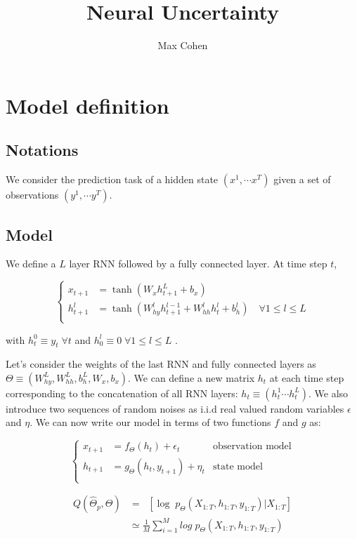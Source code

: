 \documentclass[11pt,a4paper]{report}
\begin{document}
\title{Neural Uncertainty}
\author{Max Cohen}
\maketitle

\chapter{Model definition}
\section{Notations}
We consider the prediction task of a hidden state $(x^1, \cdots x^T)$ given a set of observations $(y^1, \cdots y^T)$.

\section{Model}
We define a $L$ layer RNN followed by a fully connected layer. At time step $t$,

\begin{equation*}
    \left\{
    \begin{aligned}
        x_{t+1}   & = \tanh(W_x h_{t+1}^L + b_x)                                                               \\
        h_{t+1}^l & = \tanh(W_{hy}^l h^{l-1}_{t+1} + W_{hh}^l h^{l}_{t} + b_h^l) \quad \forall 1 \leq l \leq L \\
    \end{aligned}
    \right.
\end{equation*}

with $h_{t}^0 \equiv y_{t} \; \forall t$ and $h_{0}^l \equiv 0 \; \forall 1 \leq l \leq L$ .

Let's consider the weights of the last RNN and fully connected layers as $\Theta \equiv (W_{hy}^L, W_{hh}^L, b_h^L, W_x, b_x)$. We can define a new matrix $h_t$ at each time step corresponding to the concatenation of all RNN layers: $h_t \equiv (h_t^1 \cdots h_t^L)$. We also introduce two sequences of random noises as i.i.d real valued random variables $\epsilon$ and $\eta$. We can now write our model in terms of two functions $f$ and $g$ as:

\begin{equation}
    \left\{
    \begin{aligned}
        x_{t+1} & = f_\Theta(h_t) + \epsilon_t      & \text{observation model} \\
        h_{t+1} & = g_\Theta(h_t, y_{t+1}) + \eta_t & \text{state model}       \\
    \end{aligned}
    \right.
\end{equation}

\begin{align*}
    Q(\hat \Theta_p, \Theta) & = \mathop{\mathbb{E}_{\hat \Theta_p}} \left[ \log \; p_{\Theta}(X_{1:T}, h_{1:T}, y_{1:T}) | X_{1:T} \right] \\
                             & \simeq \frac{1}{M} \sum_{i=1}^M  log \; p_{\Theta}(X_{1:T}, h_{1:T}, y_{1:T})
\end{align*}
\end{document}
